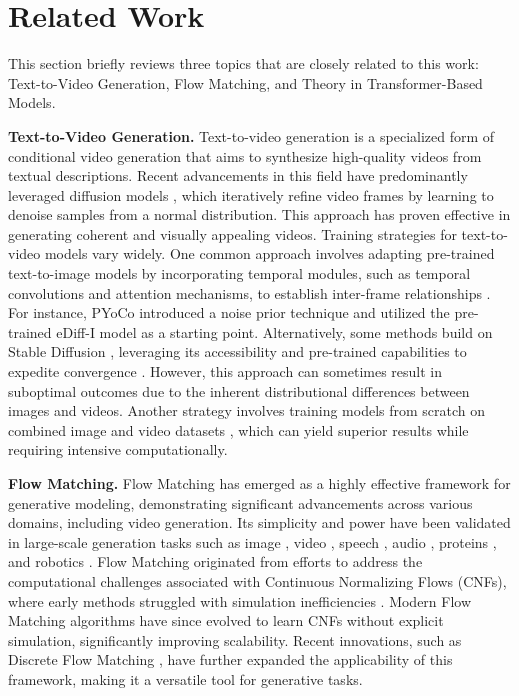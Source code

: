 \section{Related Work}
This section briefly reviews three topics that are closely related to this work: Text-to-Video Generation, Flow Matching, and Theory in Transformer-Based Models. 

{\bf Text-to-Video Generation.}
Text-to-video generation \cite{sph+22, vjp22, brl+23} is a specialized form of conditional video generation that aims to synthesize high-quality videos from textual descriptions. Recent advancements in this field have predominantly leveraged diffusion models \cite{ssk+20,hja20}, which iteratively refine video frames by learning to denoise samples from a normal distribution. This approach has proven effective in generating coherent and visually appealing videos.
Training strategies for text-to-video models vary widely. One common approach involves adapting pre-trained text-to-image models by incorporating temporal modules, such as temporal convolutions and attention mechanisms, to establish inter-frame relationships \cite{gnl+23, azy+23, sph+22, gwz+23, gyr+23}. For instance, PYoCo \cite{gnl+23} introduced a noise prior technique and utilized the pre-trained eDiff-I model \cite{bnh+22} as a starting point. Alternatively, some methods build on Stable Diffusion \cite{rbl+22}, leveraging its accessibility and pre-trained capabilities to expedite convergence \cite{brl+23,zwy+22}. However, this approach can sometimes result in suboptimal outcomes due to the inherent distributional differences between images and videos. Another strategy involves training models from scratch on combined image and video datasets \cite{hcs+22}, which can yield superior results while requiring intensive computationally.
\ifdefined\isarxiv
\else
\vspace{-2mm}
\fi

{\bf Flow Matching.}
Flow Matching has emerged as a highly effective framework for generative modeling, demonstrating significant advancements across various domains, including video generation. Its simplicity and power have been validated in large-scale generation tasks such as image \cite{ekb+24}, video \cite{pzb+24,jsl+24}, speech \cite{lvs+24},  audio \cite{vsl+23}, proteins \cite{hvf+24}, and robotics \cite{bbd+24}. Flow Matching originated from efforts to address the computational challenges associated with Continuous Normalizing Flows (CNFs), where early methods struggled with simulation inefficiencies \cite{rgnl21,bcba+22}. Modern Flow Matching algorithms \cite{lcb+22,lgl22,av22,nbsm23,hbc23,tfm+23} have since evolved to learn CNFs without explicit simulation, significantly improving scalability. Recent innovations, such as Discrete Flow Matching \cite{cyb+24,grs+24}, have further expanded the applicability of this framework, making it a versatile tool for generative tasks.

